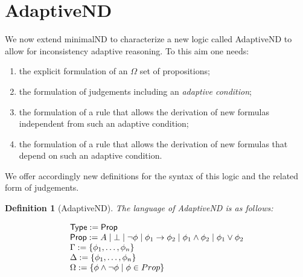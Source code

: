 \documentclass[]{article}
\newtheorem{definition}{Definition}
\newcommand{\Turn}[2]
    { {#1}\vdash_{\textbf{\sf s}}  {#2}}
\newcommand{\TurnNext}[2]
        { {#1}\vdash_{\textbf{\sf s+1}}  {#2}}
\begin{document}
%
%
%
%
%

\section{{\sf AdaptiveND}}\label{sec:adaptive}


We now extend {\sf minimalND} to characterize a new logic called {\sf AdaptiveND} to allow for inconsistency adaptive reasoning. To this aim one needs:
%
\begin{enumerate}
\item the explicit formulation of an $\Omega$ set of propositions;%
\item the formulation of judgements including an \textit{adaptive condition};
\item the formulation of a rule that allows the derivation of new formulas independent from such an adaptive condition;
\item the formulation of a rule that allows the derivation of new formulas that depend on such an adaptive condition.
\end{enumerate}
%
We offer accordingly new definitions for the syntax of this logic and the related form of judgements.

\begin{definition}[{\sf AdaptiveND}]
The language of {\sf AdaptiveND} is as follows:


\begin{displaymath}
\begin{array}{l}
{\sf Type}:={\sf Prop}\\
{\sf Prop}:= A \mid \bot \mid \neg \phi \mid \phi_{1} \rightarrow \phi_{2} \mid \phi_{1} \wedge \phi_{2} \mid \phi_{1} \vee \phi_{2}\\
\Gamma := \{\phi_{1}, \dots, \phi_{n}\}\\
\Delta := \{\phi_{1}, \dots, \phi_{n}\}\\
\Omega := \{\phi \wedge \neg \phi\mid \phi\in Prop\}\\
\end{array}
\end{displaymath}
\end{definition}
\end{document}

